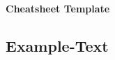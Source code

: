 \documentclass[a4paper ,landscape]{article}
\begin{document}
    \raggedright
    \footnotesize


    \begin{center}
        \Large{\textbf{Cheatsheet Template}}
    \end{center}

    \begin{multicols*}{3}

        \section*{Example-Text}\label{sec:example-text}
        

    \end{multicols*}
    \newpage

\end{document}
